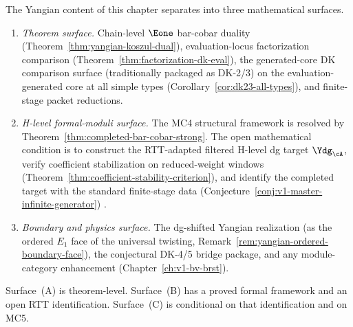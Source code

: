 \begin{remark}
\label{rem:yangian-triage}
The Yangian content of this chapter separates into three mathematical
surfaces.
\begin{enumerate}[label=\textup{(\Alph*)}]
\item \emph{Theorem surface.}
 Chain-level $\Eone$ bar-cobar duality
 (Theorem~\ref{thm:yangian-koszul-dual}),
 evaluation-locus factorization comparison
 (Theorem~\ref{thm:factorization-dk-eval}),
 the generated-core DK comparison surface
 \textup{(}traditionally packaged as DK-2/3\textup{)}
 on the evaluation-generated core at all simple types
 (Corollary~\ref{cor:dk23-all-types}),
 and finite-stage packet reductions.
\item \emph{H-level formal-moduli surface.}
 The MC4 structural framework is resolved by
 Theorem~\ref{thm:completed-bar-cobar-strong}. The open mathematical condition is
 to
 construct the RTT-adapted filtered H-level dg target
 $\Ydg_{\cA}$, verify coefficient stabilization on
 reduced-weight windows
 (Theorem~\ref{thm:coefficient-stability-criterion}), and identify
 the completed target with the standard finite-stage data
 \ifannalsedition\else
 \textup{(}Conjecture~\ref{conj:v1-master-infinite-generator}\textup{)}
 \fi.
\item \emph{Boundary and physics surface.}
 The dg-shifted Yangian realization (as the ordered $E_1$ face of the
 universal twisting, Remark~\ref{rem:yangian-ordered-boundary-face}),
 the conjectural DK-4/5 bridge package, and any
 module-category enhancement
 (Chapter~\ref{ch:v1-bv-brst}).
\end{enumerate}
Surface~(A) is theorem-level. Surface~(B) has a proved formal
framework and an open RTT identification. Surface~(C) is conditional on
that identification and on MC5.
\end{remark}

